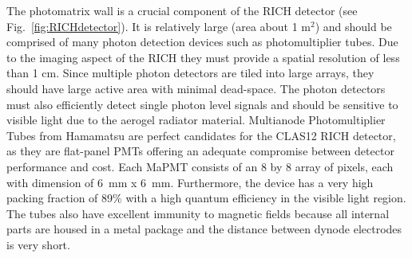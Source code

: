 The photomatrix  wall is a crucial component of the RICH detector (see Fig.~\ref{fig:RICHdetector}). It is relatively large (area about 1 m$^2$) and should be comprised of many photon detection devices such as photomultiplier tubes.
Due to the imaging aspect of the RICH they must provide a spatial resolution of less than 1 cm.
Since multiple photon detectors are tiled into large arrays, they should have large active area with minimal dead-space.
The photon detectors must also efficiently detect single photon level signals and should be sensitive to visible light due to the aerogel radiator material.
Multianode Photomultiplier Tubes from Hamamatsu are perfect candidates for the CLAS12 RICH detector, as they are flat-panel PMTs offering an adequate compromise between detector performance and cost.
Each MaPMT consists of an 8 by 8 array of pixels, each with dimension of 6~mm x 6~mm.
Furthermore, the device has a very high packing fraction of 89\% with a high quantum efficiency in the visible light region.
The tubes also have excellent immunity to magnetic fields because all internal parts are housed in a metal package and the distance between dynode electrodes is very short.



